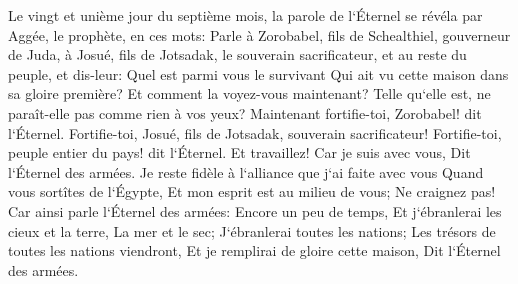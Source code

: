 \verse Le vingt et unième jour du septième mois, la parole de l`Éternel se révéla par Aggée, le prophète, en ces mots: 
\verse Parle à Zorobabel, fils de Schealthiel, gouverneur de Juda, à Josué, fils de Jotsadak, le souverain sacrificateur, et au reste du peuple, et dis-leur: 
\verse Quel est parmi vous le survivant Qui ait vu cette maison dans sa gloire première? Et comment la voyez-vous maintenant? Telle qu`elle est, ne paraît-elle pas comme rien à vos yeux? 
\verse Maintenant fortifie-toi, Zorobabel! dit l`Éternel. Fortifie-toi, Josué, fils de Jotsadak, souverain sacrificateur! Fortifie-toi, peuple entier du pays! dit l`Éternel. Et travaillez! Car je suis avec vous, Dit l`Éternel des armées. 
\verse Je reste fidèle à l`alliance que j`ai faite avec vous Quand vous sortîtes de l`Égypte, Et mon esprit est au milieu de vous; Ne craignez pas! 
\verse Car ainsi parle l`Éternel des armées: Encore un peu de temps, Et j`ébranlerai les cieux et la terre, La mer et le sec; 
\verse J`ébranlerai toutes les nations; Les trésors de toutes les nations viendront, Et je remplirai de gloire cette maison, Dit l`Éternel des armées. 
